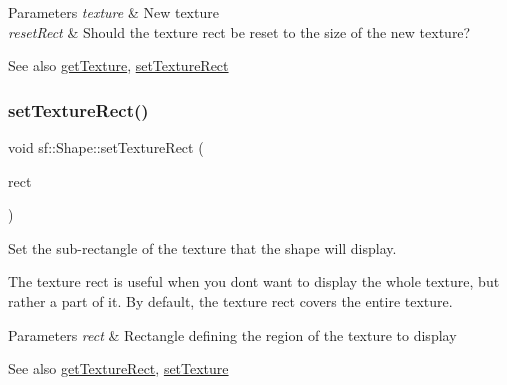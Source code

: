 \begin{DoxyParams}{Parameters}
{\em texture} & New texture \\
\hline
{\em reset\+Rect} & Should the texture rect be reset to the size of the new texture?\\
\hline
\end{DoxyParams}
\begin{DoxySeeAlso}{See also}
\hyperlink{classsf_1_1_shape_a06682d37fd38d8fad56afdd5228b6951}{get\+Texture}, \hyperlink{classsf_1_1_shape_a2029cc820d1740d14ac794b82525e157}{set\+Texture\+Rect} 
\end{DoxySeeAlso}
\mbox{\label{classsf_1_1_shape_a2029cc820d1740d14ac794b82525e157}} 
\subsubsection{\texorpdfstring{set\+Texture\+Rect()}{setTextureRect()}}
{\footnotesize\ttfamily void sf\+::\+Shape\+::set\+Texture\+Rect (\begin{DoxyParamCaption}\item[{const \hyperlink{classsf_1_1_rect}{Int\+Rect} \&}]{rect }\end{DoxyParamCaption})}



Set the sub-\/rectangle of the texture that the shape will display. 

The texture rect is useful when you don\textquotesingle{}t want to display the whole texture, but rather a part of it. By default, the texture rect covers the entire texture.


\begin{DoxyParams}{Parameters}
{\em rect} & Rectangle defining the region of the texture to display\\
\hline
\end{DoxyParams}
\begin{DoxySeeAlso}{See also}
\hyperlink{classsf_1_1_shape_ac878aab03c230dc31c44e250d092b9ea}{get\+Texture\+Rect}, \hyperlink{classsf_1_1_shape_af8fb22bab1956325be5d62282711e3b6}{set\+Texture} 
\end{DoxySeeAlso}
\mbox{\label{classsf_1_1_shape_adfb2bd966c8edbc5d6c92ebc375e4ac1}} 
